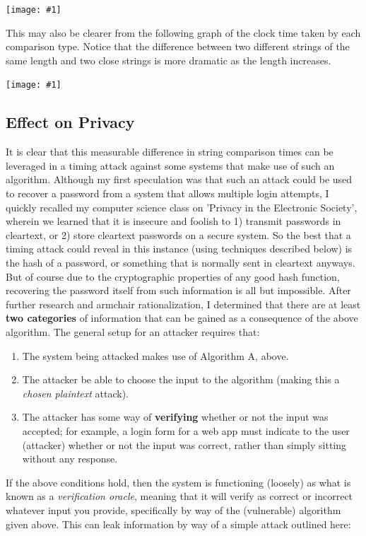 \documentclass{article}
\providecommand{\image}[1]{
    \begin{center}
        \texttt{[image: \#1]}
    \end{center}
}
\providecommand{\tightlist}{
    \setlength{\itemsep}{0pt}\setlength{\parskip}{0pt}
}
\begin{document}
\image{naive_results.png}

This may also be clearer from the following graph of the clock time taken by each comparison type. Notice that the difference between two different strings of the same length and two close strings is more dramatic as the length increases.

\image{naive_graph.png}


\subsection{Effect on Privacy}
It is clear that this measurable difference in string comparison times can be leveraged in a timing attack against some systems that make use of such an algorithm.
Although my first speculation was that such an attack could be used to recover a password from a system that allows multiple login attempts, I quickly recalled my computer science class on 'Privacy in the Electronic Society', wherein we learned that it is insecure and foolish to 1) transmit passwords in cleartext, or 2) store cleartext passwords on a secure system.
So the best that a timing attack could reveal in this instance (using techniques described below) is the hash of a password, or something that is normally sent in cleartext anyways.
But of course due to the cryptographic properties of any good hash function, recovering the password itself from such information is all but impossible. \cite{hash}
After further research and armchair rationalization, I determined that there are at least \textbf{two categories} of information that can be gained as a consequence of the above algorithm. The general setup for an attacker requires that:
\begin{enumerate}\tightlist
  \item The system being attacked makes use of Algorithm A, above.
  \item The attacker be able to choose the input to the algorithm (making this a \textit{chosen plaintext} attack).
  \item The attacker has some way of \textbf{verifying} whether or not the input was accepted; for example, a login form for a web app must indicate to the user (attacker) whether or not the input was correct, rather than simply sitting without any response.
\end{enumerate}

If the above conditions hold, then the system is functioning (loosely) as what is known as a \textit{verification oracle}, meaning that it will verify as correct or incorrect whatever input you provide, specifically by way of the (vulnerable) algorithm given above. This can leak information by way of a simple attack outlined here:
\end{document}
